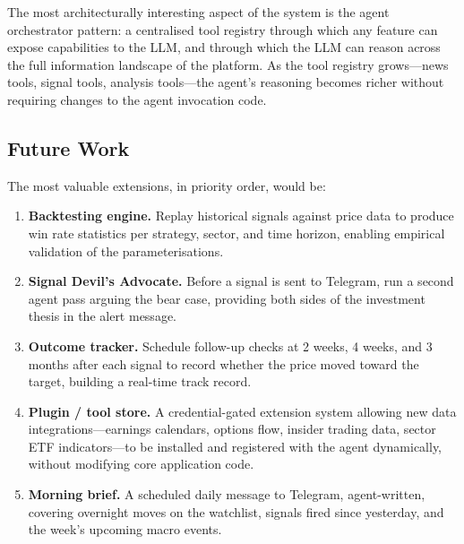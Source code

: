 \documentclass[12pt,a4paper]{article}
\begin{document}
The most architecturally interesting aspect of the system is the agent orchestrator pattern: a centralised tool registry through which any feature can expose capabilities to the LLM, and through which the LLM can reason across the full information landscape of the platform. As the tool registry grows---news tools, signal tools, analysis tools---the agent's reasoning becomes richer without requiring changes to the agent invocation code.

\subsection{Future Work}

The most valuable extensions, in priority order, would be:

\begin{enumerate}[leftmargin=2em]
    \item \textbf{Backtesting engine.} Replay historical signals against price data to produce win rate statistics per strategy, sector, and time horizon, enabling empirical validation of the parameterisations.
    \item \textbf{Signal Devil's Advocate.} Before a signal is sent to Telegram, run a second agent pass arguing the bear case, providing both sides of the investment thesis in the alert message.
    \item \textbf{Outcome tracker.} Schedule follow-up checks at 2 weeks, 4 weeks, and 3 months after each signal to record whether the price moved toward the target, building a real-time track record.
    \item \textbf{Plugin / tool store.} A credential-gated extension system allowing new data integrations---earnings calendars, options flow, insider trading data, sector ETF indicators---to be installed and registered with the agent dynamically, without modifying core application code.
    \item \textbf{Morning brief.} A scheduled daily message to Telegram, agent-written, covering overnight moves on the watchlist, signals fired since yesterday, and the week's upcoming macro events.
\end{enumerate}

\printbibliography[heading=bibintoc]
\end{document}
